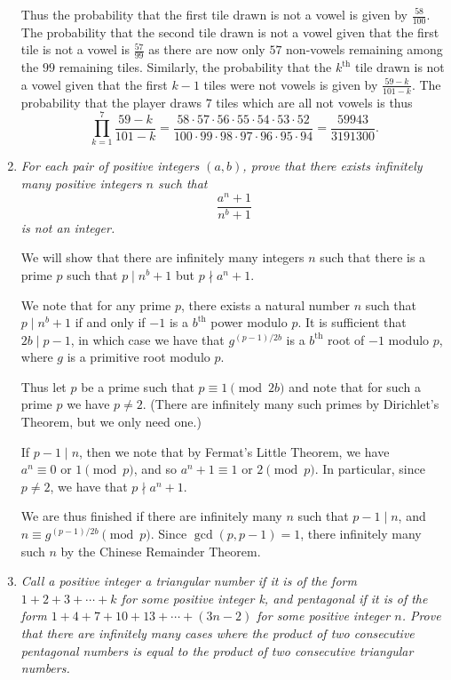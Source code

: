 \documentclass{article}
\begin{document}
\begin{enumerate}[1.]
Thus the probability that the first tile drawn is not a vowel is given by $\frac{58}{100}$. The probability that the second tile drawn is not a vowel given that the first tile is not a vowel is $\frac{57}{99}$ as there are now only $57$ non-vowels remaining among the $99$ remaining tiles. Similarly, the probability that the $k^\text{th}$ tile drawn is not a vowel given that the first $k - 1$ tiles were not vowels is given by $\frac{59 - k}{101 - k}$. The probability that the player draws $7$ tiles which are all not vowels is thus
\[
	\prod_{k = 1}^{7} \frac{59 - k}{101 - k} = \frac{58 \cdot 57 \cdot 56 \cdot 55 \cdot 54 \cdot 53 \cdot 52}{100 \cdot 99 \cdot 98 \cdot 97 \cdot 96 \cdot 95 \cdot 94} = \frac{59943}{3191300}.
\]


\vspace{6pt}
\item %
{\itshape For each pair of positive integers $(a, b)$, prove that there exists infinitely many positive integers $n$ such that
\[ \frac{a^n + 1}{n^b + 1} \]
is not an integer.}

We will show that there are infinitely many integers $n$ such that there is a prime $p$ such that $p \mid n^b + 1$ but $p \nmid a^n + 1$.

We note that for any prime $p$, there exists a natural number $n$ such that $p \mid n^b + 1$ if and only if $-1$ is a $b^\text{th}$ power modulo $p$. It is sufficient that $2b \mid p - 1$, in which case we have that $g^{(p - 1)/2b}$ is a $b^\text{th}$ root of $-1$ modulo $p$, where $g$ is a primitive root modulo $p$.

Thus let $p$ be a prime such that $p \equiv 1 \pmod{2b}$ and note that for such a prime $p$ we have $p \neq 2$. (There are infinitely many such primes by Dirichlet's Theorem, but we only need one.)

If $p - 1 \mid n$, then we note that by Fermat's Little Theorem, we have $a^n \equiv 0 \text{ or } 1 \pmod p$, and so $a^n + 1 \equiv 1 \text{ or } 2 \pmod p$. In particular, since $p \neq 2$, we have that $p \nmid a^n + 1$. 

We are thus finished if there are infinitely many $n$ such that $p - 1 \mid n$, and $n \equiv g^{(p - 1)/2b} \pmod p$. Since $\gcd(p, p - 1) = 1$, there infinitely many such $n$ by the Chinese Remainder Theorem.

\vspace{6pt}
\item %
{\itshape Call a positive integer a \emph{triangular} number if it is of the form $1 +2 +3 +\dotsb +k$ for some positive integer k, and \emph{pentagonal} if it is of the form $1 +4 +7 +10 +13 +\dotsb +(3n-2)$ for some positive integer $n$. Prove that there are infinitely many cases where the product of two consecutive pentagonal numbers is equal to the product of two consecutive triangular numbers.}


\end{enumerate}
\end{document}
